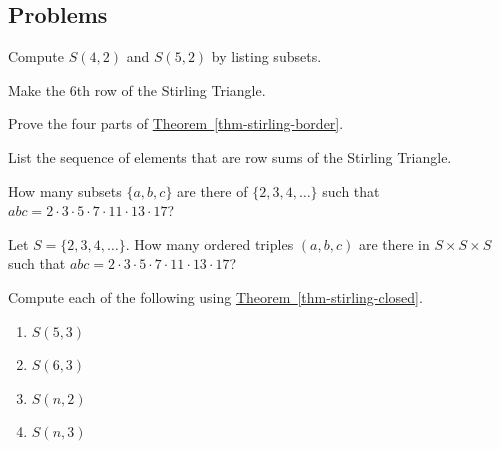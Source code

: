 \documentclass[10pt,]{book}
\theoremstyle{plain}
\theoremstyle{definition}
\theoremstyle{definition}
\theoremstyle{definition}
\theoremstyle{definition}
\numberwithin{equation}{chapter}
\begin{document}
\subsection*{Problems}\label{exercises-9}
\begin{divisionexercise}{1}\hypertarget{exercise-100}{}
\hypertarget{p-1197}{}%
Compute \(S(4,2)\) and \(S(5,2)\) by listing subsets.%
\end{divisionexercise}%
\begin{divisionexercise}{2}\hypertarget{exercise-101}{}
\hypertarget{p-1198}{}%
Make the 6th row of the Stirling Triangle.%
\end{divisionexercise}%
\begin{divisionexercise}{3}\hypertarget{exercise-102}{}
\hypertarget{p-1199}{}%
Prove the four parts of \hyperref[thm-stirling-border]{Theorem~\ref{thm-stirling-border}}.%
\end{divisionexercise}%
\begin{divisionexercise}{4}\hypertarget{exercise-103}{}
\hypertarget{p-1200}{}%
List the sequence of elements that are row sums of the Stirling Triangle.%
\end{divisionexercise}%
\begin{divisionexercise}{5}\hypertarget{exercise-104}{}
\hypertarget{p-1201}{}%
How many subsets \(\{a,b,c\}\) are there of \(\{2,3,4,\ldots\}\) such that \(abc = 2 \cdot 3 \cdot 5 \cdot 7 \cdot 11 \cdot 13 \cdot 17\)?%
\end{divisionexercise}%
\begin{divisionexercise}{6}\hypertarget{exercise-105}{}
\hypertarget{p-1202}{}%
Let \(S = \{2,3,4,\ldots\}\).  How many ordered triples \((a,b,c)\) are there in \(S\times S \times S\) such that \(abc = 2 \cdot 3 \cdot 5 \cdot 7 \cdot 11 \cdot 13 \cdot 17\)?%
\end{divisionexercise}%
\begin{divisionexercise}{7}\hypertarget{exercise-106}{}
\hypertarget{p-1203}{}%
Compute each of the following using \hyperref[thm-stirling-closed]{Theorem~\ref{thm-stirling-closed}}. \leavevmode%
\begin{enumerate}[label=(\alph*)]
\item\hypertarget{li-219}{}\(S(5,3)\)%
\item\hypertarget{li-220}{}\(S(6,3)\)%
\item\hypertarget{li-221}{}\(S(n,2)\)%
\item\hypertarget{li-222}{}\(S(n,3)\)%
\end{enumerate}
%
\end{divisionexercise}%
\end{document}
